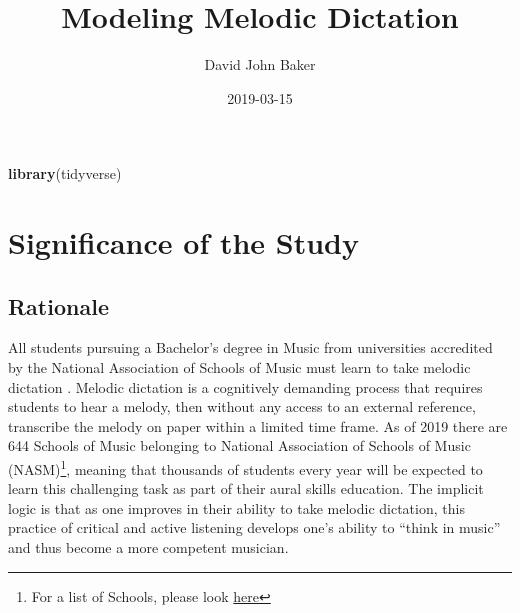 \documentclass[]{book}
\title{Modeling Melodic Dictation}
\author{David John Baker}
\date{2019-03-15}
\newenvironment{Shaded}{\begin{snugshade}}{\end{snugshade}}
\newcommand{\KeywordTok}[1]{\textcolor[rgb]{0.13,0.29,0.53}{\textbf{#1}}}
\newcommand{\NormalTok}[1]{#1}
\let\rmarkdownfootnote\footnote%
\def\footnote{\protect\rmarkdownfootnote}
\begin{document}
\maketitle

{
\setcounter{tocdepth}{1}
\tableofcontents
}
\begin{Shaded}
\begin{Highlighting}[]
\KeywordTok{library}\NormalTok{(tidyverse)}
\end{Highlighting}
\end{Shaded}

\hypertarget{significance-of-the-study}{%
\chapter{Significance of the Study}\label{significance-of-the-study}}

\hypertarget{rationale}{%
\section{Rationale}\label{rationale}}

All students pursuing a Bachelor's degree in Music from universities accredited by the National Association of Schools of Music must learn to take melodic dictation \citep[§VIII.6.B.2.A]{NationalAssociationSchools2018}.
Melodic dictation is a cognitively demanding process that requires students to hear a melody, then without any access to an external reference, transcribe the melody on paper within a limited time frame.
As of 2019 there are 644 Schools of Music belonging to National Association of Schools of Music (NASM)\footnote{For a list of Schools, please look \href{https://nasm.arts-accredit.org/directory-lists/accredited-institutions/search/?institutionname=\&city=\&state=\&country=\&search=true}{here}}, meaning that thousands of students every year will be expected to learn this challenging task as part of their aural skills education.
The implicit logic is that as one improves in their ability to take melodic dictation, this practice of critical and active listening develops one's ability to ``think in music'' \citep{bestMusicCurriculaFuture1992, karpinskiAuralSkillsAcquisition2000} and thus become a more competent musician.
\end{document}
